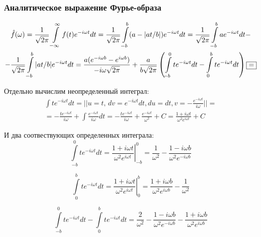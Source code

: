 \documentclass[a5paper, 10pt]{article}
\theoremstyle{definition}
\theoremstyle{plain}
\theoremstyle{remark}
\begin{document}
\subsubsection{Аналитическое выражение Фурье-образа}

\begin{multline*}
\hat{f}(\omega) = \frac{1}{\sqrt{2 \pi}} \int \limits_{-\infty}^{\infty} f(t) e^{-i \omega t} dt =
 \frac{1}{\sqrt{2 \pi}} \int \limits_{-b}^{b} (a - |at / b|) e^{-i \omega t} dt =  \frac{1}{\sqrt{2 \pi}} \int \limits_{-b}^{b} a e^{-i \omega t} dt  -\\
- \frac{1}{\sqrt{2 \pi}} \int \limits_{-b}^{b}  |at / b| e^{-i \omega t} dt =   \frac{a ( e^{-i \omega b} -  e^{i \omega b})}{-i\omega \sqrt{2 \pi}} 
+ \frac{a}{b\sqrt{2 \pi}} \left( \int \limits_{-b}^{0}  t e^{-i \omega t} dt -  \int \limits_{0}^{b}  t e^{-i \omega t} dt  \right) \fbox{=}
\end{multline*}

Отдельно вычислим неопределенный интеграл:
\begin{multline}
\int  t e^{-i \omega t} dt = \left|  \right| u = t, \, dv =  e^{-i \omega t} dt, du=dt, v = -\frac{e^{-i \omega t}}{i \omega}\left|  \right| =\\
=  -\frac{t e^{-i \omega t}}{i \omega} + \int \frac{e^{-i \omega t}}{i \omega} dt =  -\frac{t e^{-i \omega t}}{i \omega} + \frac{e^{-i \omega t}}{ \omega^2} + C = \frac{1 + i \omega t}{\omega^2 e^{i \omega t}} + C
\end{multline} 

И два соотвествующих определенных интеграла:
\begin{equation}
\int \limits_{-b}^{0}  t e^{-i \omega t} dt =  \left. \frac{1 + i \omega t}{\omega^2 e^{i \omega t}} \right|^0_{-b} =  \frac{1}{\omega^2} -
 \frac{1 - i \omega b}{\omega^2 e^{-i \omega b}}
\end{equation}

\begin{equation}
\int \limits_{0}^{b}  t e^{-i \omega t} dt =  \left. \frac{1 + i \omega t}{\omega^2 e^{i \omega t}} \right|^b_{0} =
 \frac{1 + i \omega b}{\omega^2 e^{i \omega b}} -\frac{1}{\omega^2} 
\end{equation}

\begin{equation}
\int \limits_{-b}^{0}  t e^{-i \omega t} dt -  \int \limits_{0}^{b}  t e^{-i \omega t} dt  =  \frac{2}{\omega^2} -
 \frac{1 - i \omega b}{\omega^2 e^{-i \omega b}} - \frac{1 + i \omega b}{\omega^2 e^{i \omega b}} 
\end{equation}
\end{document}
